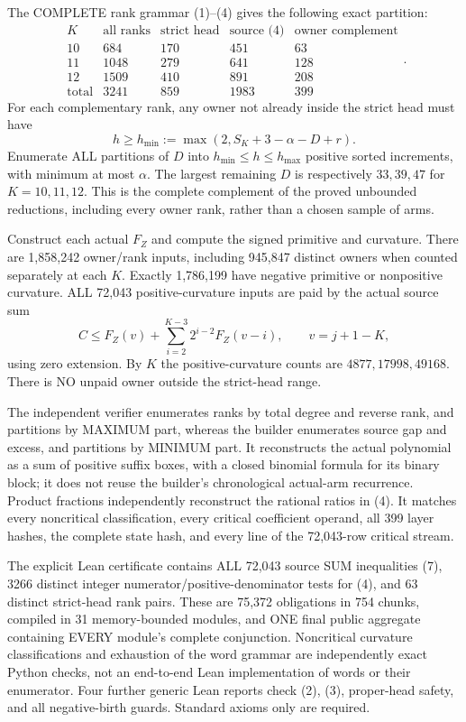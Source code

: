The COMPLETE rank grammar (1)--(4) gives the following exact partition:
\[
\begin{array}{c|rrrr}
 K&\text{all ranks}&\text{strict head}&\text{source (4)}&\text{owner complement}\\\hline
10&684&170&451&63\\
11&1048&279&641&128\\
12&1509&410&891&208\\\hline
\text{total}&3241&859&1983&399
\end{array}.                                             \tag{5}
\]
For each complementary rank, any owner not already inside the strict
head must have
\[
 h\ge h_{\min}:=\max(2,S_K+3-\alpha-D+r).              \tag{6}
\]
Enumerate ALL partitions of $D$ into $h_{\min}\le h\le h_{\max}$
positive sorted increments, with minimum at most $\alpha$.
The largest remaining $D$ is respectively $33,39,47$ for $K=10,11,12$.
This is the complete complement of the proved unbounded reductions,
including every owner rank, rather than a chosen sample of arms.

Construct each actual $F_Z$ and compute the signed primitive and curvature.
There are 1,858,242 owner/rank inputs, including 945,847 distinct owners
when counted separately at each $K$. Exactly 1,786,199 have negative
primitive or nonpositive curvature. ALL 72,043 positive-curvature inputs
are paid by the actual source sum
\[
 C\le F_Z(v)+\sum_{i=2}^{K-3}2^{i-2}F_Z(v-i),
                  \qquad v=j+1-K,                       \tag{7}
\]
using zero extension. By $K$ the positive-curvature counts are
$4877,17998,49168$. There is NO unpaid owner outside the strict-head range.

The independent verifier enumerates ranks by total degree and reverse
rank, and partitions by MAXIMUM part, whereas the builder enumerates
source gap and excess, and partitions by MINIMUM part. It reconstructs
the actual polynomial as a sum of positive suffix boxes, with a closed
binomial formula for its binary block; it does not reuse the builder's
chronological actual-arm recurrence. Product fractions independently
reconstruct the rational ratios in (4). It matches every noncritical
classification, every critical coefficient operand, all 399 layer hashes,
the complete state hash, and every line of the 72,043-row critical stream.

The explicit Lean certificate contains ALL 72,043 source SUM inequalities
(7), 3266 distinct integer numerator/positive-denominator tests for (4),
and 63 distinct strict-head rank pairs. These are 75,372 obligations in
754 chunks, compiled in 31 memory-bounded modules, and ONE final public
aggregate containing EVERY module's complete conjunction. Noncritical curvature classifications
and exhaustion of the word grammar are independently exact Python checks,
not an end-to-end Lean implementation of words or their enumerator.
Four further generic Lean reports check (2), (3), proper-head safety,
and all negative-birth guards. Standard axioms only are required.

